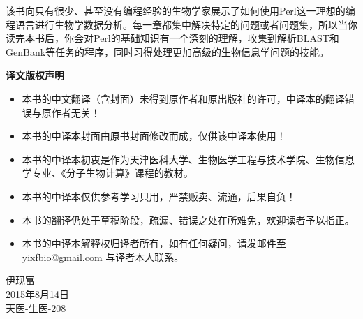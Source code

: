 \thispagestyle{empty}
该书向只有很少、甚至没有编程经验的生物学家展示了如何使用Perl这一理想的编程语言进行生物学数据分析。每一章都集中解决特定的问题或者问题集，所以当你读完本书后，你会对Perl的基础知识有一个深刻的理解，收集到解析BLAST和GenBank等任务的程序，同时习得处理更加高级的生物信息学问题的技能。

\vfill
\begin{mdframed}[linecolor=red,linewidth=2pt,backgroundcolor=red!10]
\begin{center}
{\LARGE \bf 译文版权声明}
\end{center}

\vspace{1em}

\begin{itemize}
  \item 本书的中文翻译（含封面）未得到原作者和原出版社的许可，中译本的翻译错误与原作者无关！
  \item 本书的中译本封面由原书封面修改而成，仅供该中译本使用！
  \item 本书的中译本初衷是作为天津医科大学、生物医学工程与技术学院、生物信息学专业、《分子生物计算》课程的教材。
  \item 本书的中译本仅供参考学习只用，严禁贩卖、流通，后果自负！
  \item 本书的翻译仍处于草稿阶段，疏漏、错误之处在所难免，欢迎读者予以指正。
  \item 本书的中译本解释权归译者所有，如有任何疑问，请发邮件至 \href{mailto:yixfbio@gmail.com}{yixfbio@gmail.com} 与译者本人联系。
\end{itemize}
\begin{flushright}
伊现富\\
2015年8月14日\\
天医-生医-208
\end{flushright}
\end{mdframed}

\newpage
\null
\thispagestyle{empty}
\newpage

